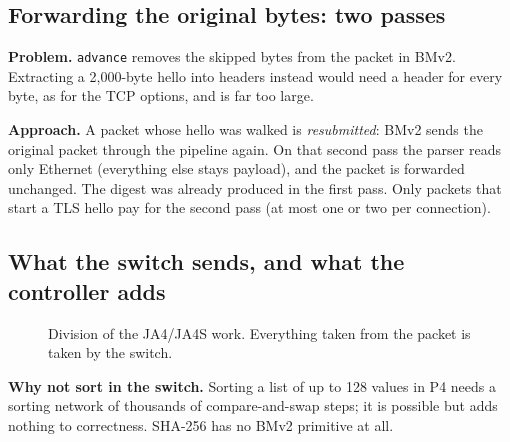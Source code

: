 \documentclass[11pt,a4paper]{article}
\newcommand{\code}[1]{\texttt{#1}}
\begin{document}
\subsection{Forwarding the original bytes: two passes}

\textbf{Problem.} \code{advance} removes the skipped bytes from the packet in BMv2. Extracting a 2,000-byte hello into
headers instead would need a header for every byte, as for the TCP options, and is far too large.

\textbf{Approach.} A packet whose hello was walked is \emph{resubmitted}: BMv2 sends the original packet through the
pipeline again. On that second pass the parser reads only Ethernet (everything else stays payload), and the packet
is forwarded unchanged. The digest was already produced in the first pass. Only packets that start a TLS hello pay
for the second pass (at most one or two per connection).

\subsection{What the switch sends, and what the controller adds}
\label{sec:tls-out}

\begin{figure}[H]\centering
{}
\caption{Division of the JA4/JA4S work. Everything taken from the packet is taken by the switch.}
\end{figure}

\textbf{Why not sort in the switch.} Sorting a list of up to 128 values in P4 needs a sorting network of thousands
of compare-and-swap steps; it is possible but adds nothing to correctness. SHA-256 has no BMv2 primitive at all.
\end{document}
